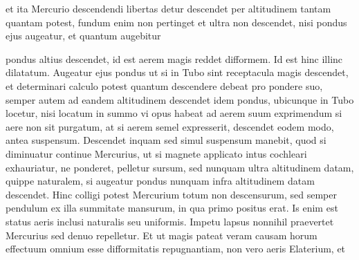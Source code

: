                         et ita Mercurio\protect{} descendendi libertas detur descendet per altitudinem  tantam quantam potest, fundum enim non pertinget et  ultra non descendet, nisi pondus\protect{} ejus augeatur, et quantum  augebitur \rule[-5mm]{0cm}{5mm}pondus\protect{} altius descendet, id est aerem magis reddet  difformem. Id est hinc  illinc  dilatatum.  Augeatur ejus pondus\protect{} ut si in Tubo sint receptacula  magis descendet,  et determinari calculo potest quantum descendere debeat  pro pondere\protect{} suo, semper autem ad eandem altitudinem  descendet idem pondus\protect{}, ubicunque in Tubo locetur, nisi locatum in summo  vi opus habeat ad aerem suum exprimendum si aere non sit  purgatum, at si aerem semel expresserit, descendet eodem  modo, antea suspensum. Descendet inquam sed simul suspensum  manebit, quod si diminuatur continue Mercurius\protect{}, ut si magnete\protect{}  applicato intus cochleari\protect{} exhauriatur, ne ponderet, pelletur  sursum, sed nunquam ultra altitudinem datam, quippe  naturalem, si augeatur pondus\protect{} nunquam infra altitudinem  datam descendet. Hinc colligi potest Mercurium\protect{} totum  non descensurum, sed semper pendulum ex illa summitate  mansurum, in qua primo positus erat. Is enim est status aeris  inclusi naturalis seu uniformis. Impetu\protect{} lapsus nonnihil praevertet Mercurius\protect{} sed  denuo repelletur. Et ut magis pateat veram causam horum effectuum  omnium esse difformitatis repugnantiam, non vero aeris Elaterium\protect{}, et 
